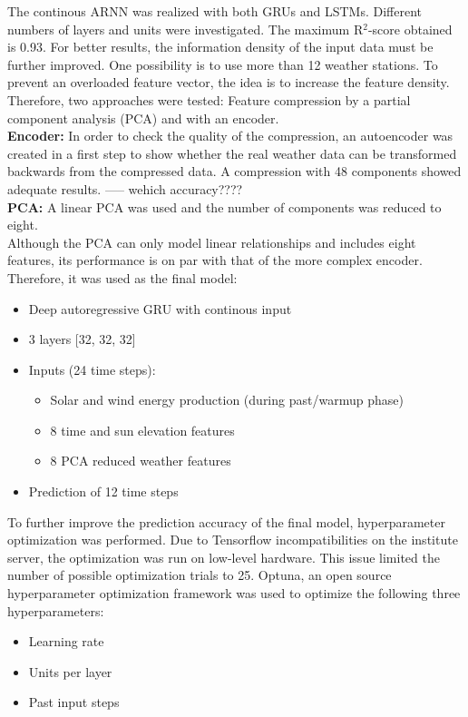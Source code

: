 \documentclass[11pt,table]{article}
\begin{document}
The continous ARNN was realized with both GRUs and LSTMs. Different numbers of layers and units were investigated. The maximum R$^2$-score obtained is 0.93. For better results, the information density of the input data must be further improved. One possibility is to use more than 12 weather stations. To prevent an overloaded feature vector, the idea is to increase the feature density. Therefore, two approaches were tested: Feature compression by a partial component analysis (PCA) and with an encoder.\\
\textbf{Encoder:}
In order to check the quality of the compression, an autoencoder was created in a first step to show whether the real weather data can be transformed backwards from the compressed data. A compression with 48 components showed adequate results. ----- wehich accuracy????\\
\textbf{PCA:}
A linear PCA was used and the number of components was reduced to eight.\\
Although the PCA can only model linear relationships and includes eight features, its performance is on par with that of the more complex encoder. Therefore, it was used as the final model:
\begin{itemize}
\item Deep autoregressive GRU with continous input
\item 3 layers [32, 32, 32]
\item Inputs (24 time steps):
\begin{itemize}
\item Solar and wind energy production (during past/warmup phase)
\item 8 time and sun elevation features
\item 8 PCA reduced weather features
\end{itemize}
\item Prediction of 12 time steps 
\end{itemize}

To further improve the prediction accuracy of the final model, hyperparameter optimization was performed. Due to Tensorflow incompatibilities on the institute server, the optimization was run on low-level hardware. This issue limited the number of possible optimization trials to 25. Optuna, an open source hyperparameter optimization framework was used to optimize the following three hyperparameters: 
\begin{itemize}
\item Learning rate
\item Units per layer
\item Past input steps
\end{itemize}
\end{document}
